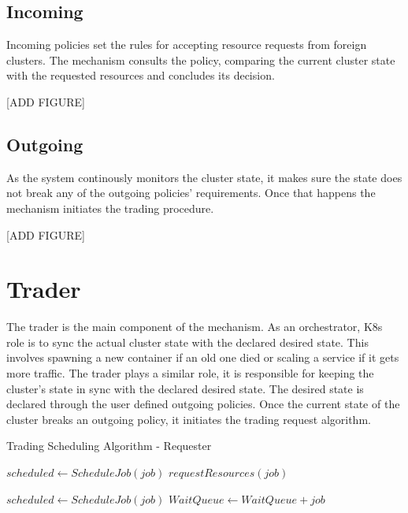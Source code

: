 \subsection{Incoming} 

Incoming policies set the rules for accepting resource requests from foreign
clusters. The mechanism consults the policy, comparing the current cluster
state with the requested resources and concludes its decision.

[ADD FIGURE]

\subsection{Outgoing}

As the system continously monitors the cluster state, it makes sure the state
does not break any of the outgoing policies' requirements. Once that happens
the mechanism initiates the trading procedure. 

[ADD FIGURE]

\section{Trader}

The trader is the main component of the mechanism. As an orchestrator, K8s role
is to sync the actual cluster state with the declared desired state. This
involves spawning a new container if an old one died or scaling a service if it
gets more traffic. The trader plays a similar role, it is responsible for
keeping the cluster's state in sync with the declared desired state. The
desired state is declared through the user defined outgoing policies. Once the
current state of the cluster breaks an outgoing policy, it initiates the
trading request algorithm. 
\begin{algorithm}[H]
\caption{Trading Scheduling Algorithm - Requester}
\begin{algorithmic}
        \State $scheduled \gets ScheduleJob(job)$
        \State $requestResources(job)$
        \EndIf
    \EndFor

        \State $scheduled \gets ScheduleJob(job)$
        \State $WaitQueue \gets WaitQueue + job$
        \EndIf
    \EndFor
\end{algorithmic}
\end{algorithm}

